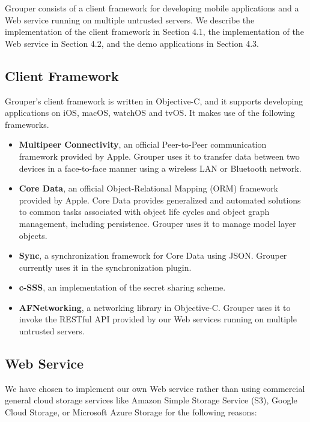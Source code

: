 \documentclass[sigconf]{acmart}
\begin{document}
Grouper consists of a client framework for developing mobile applications and a Web service running on multiple untrusted servers.
We describe the implementation of the client framework in Section 4.1, the implementation of the Web service in Section 4.2, and the demo applications in Section 4.3.

\subsection{Client Framework}

Grouper's client framework is written in Objective-C, and it supports developing applications on iOS, macOS, watchOS and tvOS.
It makes use of the following frameworks.   

\begin{itemize}
	\setlength{\itemsep}{1pt}
	\setlength{\parskip}{0pt}
	\setlength{\parsep}{0pt}
	\item 
	\textbf{Multipeer Connectivity}\cite{mc}, an official Peer-to-Peer communication framework provided by Apple. 
	Grouper uses it to transfer data between two devices in a face-to-face manner using a wireless LAN or Bluetooth network.
	\item 
	\textbf{Core Data}\cite{coredata}, an official Object-Relational Mapping (ORM) framework provided by Apple.
	Core Data provides generalized and automated solutions to common tasks associated with object life cycles and object graph management, including persistence. 
	Grouper uses it to manage model layer objects. 
	\item 
	\textbf{Sync}\cite{sync}, a synchronization framework for Core Data using JSON.
	Grouper currently uses it in the synchronization plugin.
	\item 
	\textbf{c-SSS}\cite{c-sss}, an implementation of the secret sharing scheme.
	\item 
	\textbf{AFNetworking}\cite{afnetworking}, a networking library in Objective-C. 
	Grouper uses it to invoke the RESTful API provided by our Web services running on multiple untrusted servers. 
\end{itemize}

\subsection{Web Service}

We have chosen to implement our own Web service rather than using commercial general cloud storage services like Amazon Simple Storage Service (S3), Google Cloud Storage, or Microsoft Azure Storage for the following reasons:
\end{document}
